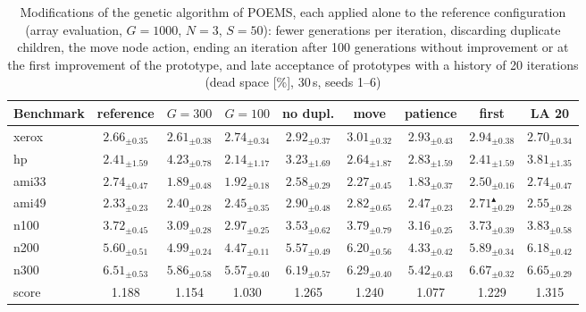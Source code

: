 \begin{table}
\centering
\footnotesize
\setlength{\tabcolsep}{4pt}
\begin{tabular}{@{}lcccccccc@{}}
\toprule
Benchmark & reference & $G = 300$ & $G = 100$ & no dupl. & move & patience & first & LA 20 \\
\midrule
xerox & $2.66_{\pm 0.35}$ & $2.61_{\pm 0.38}$ & $2.74_{\pm 0.34}$ & $2.92_{\pm 0.37}$ & $3.01_{\pm 0.32}$ & $2.93_{\pm 0.43}$ & $2.94_{\pm 0.38}$ & $2.70_{\pm 0.34}$ \\
hp & $2.41_{\pm 1.59}$ & $4.23_{\pm 0.78}$ & $2.14_{\pm 1.17}$ & $3.23_{\pm 1.69}$ & $2.64_{\pm 1.87}$ & $2.83_{\pm 1.59}$ & $2.41_{\pm 1.59}$ & $3.81_{\pm 1.35}$ \\
ami33 & $2.74_{\pm 0.47}$ & $\mathbf{1.89_{\pm 0.48}}$ & $\mathbf{1.92_{\pm 0.18}}$ & $2.58_{\pm 0.29}$ & $2.27_{\pm 0.45}$ & $\mathbf{1.83_{\pm 0.37}}$ & $2.50_{\pm 0.16}$ & $2.74_{\pm 0.47}$ \\
ami49 & $2.33_{\pm 0.23}$ & $2.40_{\pm 0.28}$ & $2.45_{\pm 0.35}$ & $2.90_{\pm 0.48}$ & $2.82_{\pm 0.65}$ & $2.47_{\pm 0.23}$ & $2.71_{\pm 0.29}^{\blacktriangle}$ & $2.55_{\pm 0.28}$ \\
n100 & $3.72_{\pm 0.45}$ & $\mathbf{3.09_{\pm 0.28}}$ & $\mathbf{2.97_{\pm 0.25}}$ & $3.53_{\pm 0.62}$ & $3.79_{\pm 0.79}$ & $3.16_{\pm 0.25}$ & $3.73_{\pm 0.39}$ & $3.83_{\pm 0.58}$ \\
n200 & $5.60_{\pm 0.51}$ & $\mathbf{4.99_{\pm 0.24}}$ & $\mathbf{4.47_{\pm 0.11}}$ & $5.57_{\pm 0.49}$ & $6.20_{\pm 0.56}$ & $\mathbf{4.33_{\pm 0.42}}$ & $5.89_{\pm 0.34}$ & $6.18_{\pm 0.42}$ \\
n300 & $6.51_{\pm 0.53}$ & $5.86_{\pm 0.58}$ & $\mathbf{5.57_{\pm 0.40}}$ & $6.19_{\pm 0.57}$ & $6.29_{\pm 0.40}$ & $\mathbf{5.42_{\pm 0.43}}$ & $6.67_{\pm 0.32}$ & $6.65_{\pm 0.29}$ \\
\midrule
score & 1.188 & 1.154 & 1.030 & 1.265 & 1.240 & 1.077 & 1.229 & 1.315 \\
\bottomrule
\end{tabular}
\caption{Modifications of the genetic algorithm of POEMS, each applied alone to the reference configuration (array evaluation, $G = 1000$, $N = 3$, $S = 50$): fewer generations per iteration, discarding duplicate children, the move node action, ending an iteration after 100 generations without improvement or at the first improvement of the prototype, and late acceptance of prototypes with a history of 20 iterations (dead space [\%], 30\,s, seeds 1--6)}
\label{tab:rq2ga}
\end{table}
